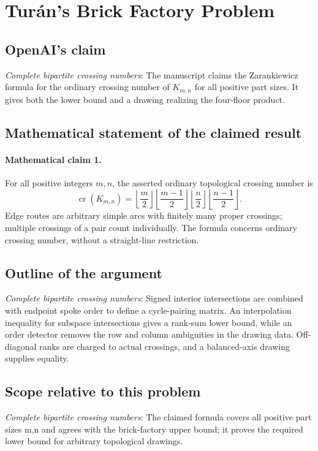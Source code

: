 \documentclass[11pt]{article}
\begin{document}
\section*{Turán's Brick Factory Problem}

\subsection{OpenAI's claim}
\textit{Complete bipartite crossing numbers}: The manuscript claims the Zarankiewicz formula for the ordinary crossing number of $K_{m,n}$ for all positive part sizes. It gives both the lower bound and a drawing realizing the four-floor product.

\subsection{Mathematical statement of the claimed result}
\paragraph{Mathematical claim 1.} For all positive integers $m,n$, the asserted ordinary topological crossing number is \[\operatorname{cr}(K_{m,n})=\left\lfloor\frac m2\right\rfloor\left\lfloor\frac{m-1}2\right\rfloor\left\lfloor\frac n2\right\rfloor\left\lfloor\frac{n-1}2\right\rfloor.\] Edge routes are arbitrary simple arcs with finitely many proper crossings; multiple crossings of a pair count individually. The formula concerns ordinary crossing number, without a straight-line restriction.

\subsection{Outline of the argument}
\textit{Complete bipartite crossing numbers}: Signed interior intersections are combined with endpoint spoke order to define a cycle-pairing matrix. An interpolation inequality for subspace intersections gives a rank-sum lower bound, while an order detector removes the row and column ambiguities in the drawing data. Off-diagonal ranks are charged to actual crossings, and a balanced-axis drawing supplies equality.

\subsection{Scope relative to this problem}
\textit{Complete bipartite crossing numbers}: The claimed formula covers all positive part sizes m,n and agrees with the brick-factory upper bound; it proves the required lower bound for arbitrary topological drawings.
\end{document}

